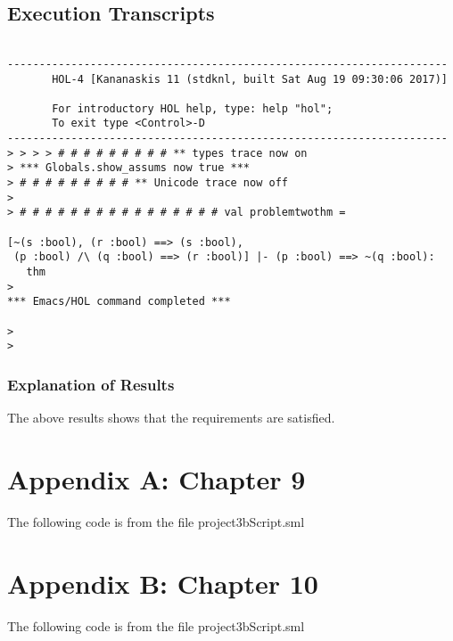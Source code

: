 \documentclass{report}
\begin{document}
\section{Execution Transcripts}
\label{sec:exec-transcr-5}

\setcounter{sessioncount}{0}
\begin{session}
  \begin{scriptsize}
\begin{verbatim}

---------------------------------------------------------------------
       HOL-4 [Kananaskis 11 (stdknl, built Sat Aug 19 09:30:06 2017)]

       For introductory HOL help, type: help "hol";
       To exit type <Control>-D
---------------------------------------------------------------------
> > > > # # # # # # # # # ** types trace now on
> *** Globals.show_assums now true ***
> # # # # # # # # # ** Unicode trace now off
> 
> # # # # # # # # # # # # # # # # val problemtwothm =
   
[~(s :bool), (r :bool) ==> (s :bool),
 (p :bool) /\ (q :bool) ==> (r :bool)] |- (p :bool) ==> ~(q :bool):
   thm
> 
*** Emacs/HOL command completed ***

> 
> 
\end{verbatim}
  \end{scriptsize}
\end{session}

\subsection{Explanation of Results}
\label{sec:explanation-results-5}
The above results shows that the requirements are satisfied.


\chapter{Appendix A: Chapter 9}
\label{cha:appendix-a:chapter9}

The following code is from the file project3bScript.sml


\chapter{Appendix B: Chapter 10}
\label{cha:appendix-a:chapter10}

The following code is from the file project3bScript.sml

\end{document}
